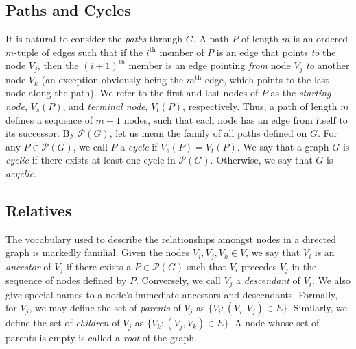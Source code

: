 \documentclass[12pt,twoside]{reedthesis}
\begin{document}
	\subsection*{Paths and Cycles}
	It is natural to consider the {\em paths} through $G$.
	A path $P$ of length $m$ is an ordered $m$-tuple of edges such that
	if the $i^{\text{th}}$ member of $P$ is an edge that points {\em to} the node $V_j$, then the $(i+1)^{\text{th}}$ member is an edge pointing {\em from} node $V_j$ {\em to} another node $V_k$ 
	(an exception obviously being the $m^{\textrm{th}}$ edge, which points to the last node along the path). 
	We refer to the first and last nodes of $P$ as the {\em starting node}, $V_s(P)$, and {\em terminal node}, $V_t(P)$, respectively. 
	 Thus, a path of length $m$ defines a sequence of $m+1$ nodes, such that each node has an edge from itself to its successor. 
	 By $\mathcal{P}(G)$, let us mean the family of all paths defined on $G$. For any $P \in \mathcal{P}(G)$, we call $P$ a {\em cycle} if $V_s(P) = V_t(P)$. We say that a graph $G$ is {\em cyclic} if there exists at least one cycle in $\mathcal{P}(G)$. Otherwise, we say that $G$ is {\em acyclic}.
	
	\subsection*{Relatives}
	The vocabulary used to describe the relationships amongst nodes in a directed graph is markedly familial. Given the nodes $V_i, V_j, V_k \in V$, we say that $V_i$ is an {\em ancestor} of $V_j$ if there exists a $P \in \mathcal{P}(G)$ such that $V_i$ precedes $V_j$ in the sequence of nodes defined by $P$. Conversely, we call $V_j$ a {\em descendant} of $V_i$. We also give special names to a node's immediate ancestors and descendants. Formally, for $V_j$, we may define the set of {\em parents} of $V_j$ as $\{V_i : (V_i,V_j) \in E \}$. Similarly, we define the set of {\em children} of $V_j$ as $\{V_k : (V_j, V_k) \in E\}$. A node whose set of parents is empty is called a {\em root} of the graph.
	
\end{document}
